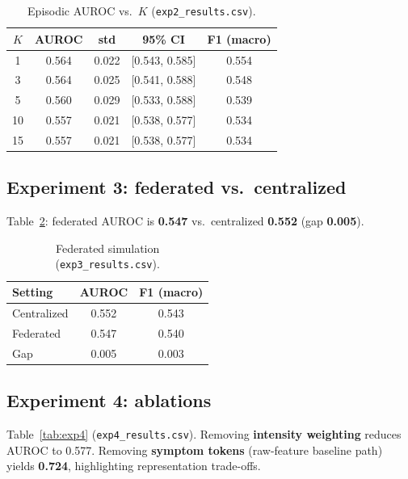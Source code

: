 \begin{table}[htbp]
  \centering
  \caption{Episodic AUROC vs.\ $K$ (\texttt{exp2\_results.csv}).}
  \label{tab:exp2}
  \begin{tabular}{ccccc}
    \toprule
    $K$ & AUROC & std & 95\% CI & F1 (macro) \\
    \midrule
    1 & 0.564 & 0.022 & [0.543, 0.585] & 0.554 \\
    3 & 0.564 & 0.025 & [0.541, 0.588] & 0.548 \\
    5 & 0.560 & 0.029 & [0.533, 0.588] & 0.539 \\
    10 & 0.557 & 0.021 & [0.538, 0.577] & 0.534 \\
    15 & 0.557 & 0.021 & [0.538, 0.577] & 0.534 \\
    \bottomrule
  \end{tabular}
\end{table}

\subsection{Experiment 3: federated vs.\ centralized}
Table~\ref{tab:exp3}: federated AUROC is \textbf{0.547} vs.\ centralized \textbf{0.552} (gap \textbf{0.005}).

\begin{table}[htbp]
  \centering
  \caption{Federated simulation (\texttt{exp3\_results.csv}).}
  \label{tab:exp3}
  \begin{tabular}{lcc}
    \toprule
    Setting & AUROC & F1 (macro) \\
    \midrule
    Centralized & 0.552 & 0.543 \\
    Federated & 0.547 & 0.540 \\
    Gap & 0.005 & 0.003 \\
    \bottomrule
  \end{tabular}
\end{table}

\subsection{Experiment 4: ablations}
Table~\ref{tab:exp4} (\texttt{exp4\_results.csv}). Removing \textbf{intensity weighting} reduces AUROC to 0.577. Removing \textbf{symptom tokens} (raw-feature baseline path) yields \textbf{0.724}, highlighting representation trade-offs.

